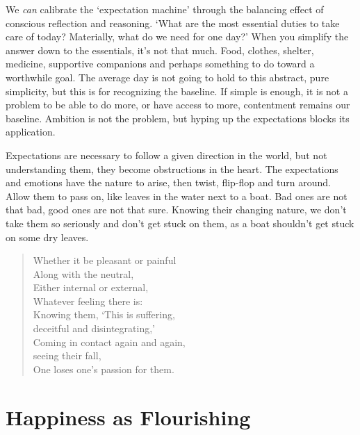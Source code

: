 
We \emph{can} calibrate the `expectation machine' through the balancing
effect of conscious reflection and reasoning. `What are the most
essential duties to take care of today? Materially, what do we need for
one day?' When you simplify the answer down to the essentials, it's not
that much. Food, clothes, shelter, medicine, supportive companions and
perhaps something to do toward a worthwhile goal. The average day is not
going to hold to this abstract, pure simplicity, but this is for
recognizing the baseline. If simple is enough, it is not a problem to be
able to do more, or have access to more, contentment remains our
baseline. Ambition is not the problem, but hyping up the expectations
blocks its application.

Expectations are necessary to follow a given direction in the world, but
not understanding them, they become obstructions in the heart. The
expectations and emotions have the nature to arise, then twist,
flip-flop and turn around. Allow them to pass on, like leaves in the
water next to a boat. Bad ones are not that bad, good ones are not that
sure. Knowing their changing nature, we don't take them so seriously and
don't get stuck on them, as a boat shouldn't get stuck on some dry
leaves.

\begin{quote}
Whether it be pleasant or painful\\
Along with the neutral,\\
Either internal or external,\\
Whatever feeling there is:\\
Knowing them, `This is suffering,\\
deceitful and disintegrating,'\\
Coming in contact again and again,\\
seeing their fall,\\
One loses one's passion for them.

\bigskip

\end{quote}

\clearpage

\section{Happiness as Flourishing}

